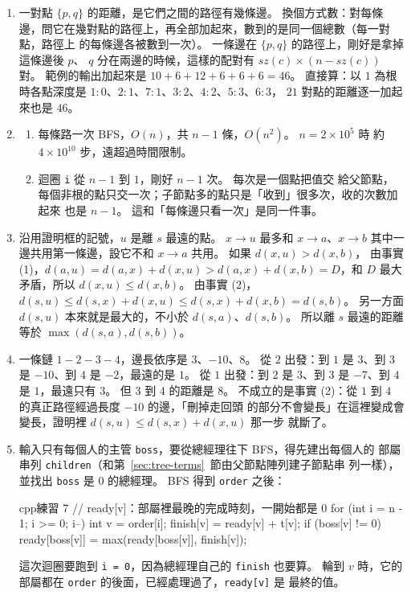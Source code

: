 \begin{enumerate}
\item 一對點 $\{p, q\}$ 的距離，是它們之間的路徑有幾條邊。 換個方式數：對每條
邊，問它在幾對點的路徑上，再全部加起來，數到的是同一個總數（每一對點，路徑上
的每條邊各被數到一次）。 一條邊在 $\{p, q\}$ 的路徑上，剛好是拿掉這條邊後 $p$、
$q$ 分在兩邊的時候，這樣的配對有 $\mathit{sz}(c) \times (n - \mathit{sz}(c))$
對。 範例的輸出加起來是 $10 + 6 + 12 + 6 + 6 + 6 = 46$。 直接算：以 $1$ 為根
時各點深度是 $1{:}0$、$2{:}1$、$7{:}1$、$3{:}2$、$4{:}2$、$5{:}3$、$6{:}3$，
$21$ 對點的距離逐一加起來也是 $46$。

\item
\begin{enumerate}
\item 每條路一次 BFS，$O(n)$，共 $n - 1$ 條，$O(n^2)$。 $n = 2 \times 10^5$ 時
約 $4 \times 10^{10}$ 步，遠超過時間限制。
\item 迴圈 \texttt{i} 從 $n - 1$ 到 $1$，剛好 $n - 1$ 次。 每次是一個點把值交
給父節點，每個非根的點只交一次；子節點多的點只是「收到」很多次，收的次數加起來
也是 $n - 1$。 這和「每條邊只看一次」是同一件事。
\end{enumerate}

\item 沿用證明框的記號，$u$ 是離 $s$ 最遠的點。 $x \to u$ 最多和 $x \to a$、$x
\to b$ 其中一邊共用第一條邊，設它不和 $x \to a$ 共用。 如果 $d(x, u) > d(x, b)$，
由事實 (1)，$d(a, u) = d(a, x) + d(x, u) > d(a, x) + d(x, b) = D$，和 $D$ 最大
矛盾，所以 $d(x, u) \le d(x, b)$。 由事實 (2)，$d(s, u) \le d(s, x) + d(x, u)
\le d(s, x) + d(x, b) = d(s, b)$。 另一方面 $d(s, u)$ 本來就是最大的，不小於
$d(s, a)$、$d(s, b)$。 所以離 $s$ 最遠的距離等於 $\max(d(s, a), d(s, b))$。

\item 一條鏈 $1 - 2 - 3 - 4$，邊長依序是 $3$、$-10$、$8$。 從 $2$ 出發：到 $1$
是 $3$、到 $3$ 是 $-10$、到 $4$ 是 $-2$，最遠的是 $1$。 從 $1$ 出發：到 $2$ 是
$3$、到 $3$ 是 $-7$、到 $4$ 是 $1$，最遠只有 $3$。 但 $3$ 到 $4$ 的距離是 $8$。
不成立的是事實 (2)：從 $1$ 到 $4$ 的真正路徑經過長度 $-10$ 的邊，「刪掉走回頭
的部分不會變長」在這裡變成會變長，證明裡 $d(s, u) \le d(s, x) + d(x, u)$ 那一步
就斷了。

\item 輸入只有每個人的主管 \texttt{boss}，要從總經理往下 BFS，得先建出每個人的
部屬串列 \texttt{children}（和第~\ref{sec:tree-terms}~節由父節點陣列建子節點串
列一樣），並找出 \texttt{boss} 是 $0$ 的總經理。 BFS 得到 \texttt{order} 之後：
\begin{code}{cpp}{練習 7}
// ready[v]：部屬裡最晚的完成時刻，一開始都是 0
for (int i = n - 1; i >= 0; i--) {
    int v = order[i];
    finish[v] = ready[v] + t[v];
    if (boss[v] != 0) {
        ready[boss[v]] = max(ready[boss[v]], finish[v]);
    }
}
\end{code}
這次迴圈要跑到 \texttt{i = 0}，因為總經理自己的 \texttt{finish} 也要算。 輪到
$v$ 時，它的部屬都在 \texttt{order} 的後面，已經處理過了，\texttt{ready[v]} 是
最終的值。
\end{enumerate}
